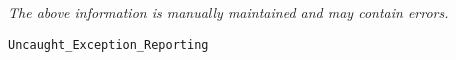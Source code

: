 \label{pkg:uncaught\_exception\_reporting}

{\tiny \it The above information is manually maintained and may contain errors.}
\begin{verbatim}
Uncaught_Exception_Reporting
\end{verbatim}
